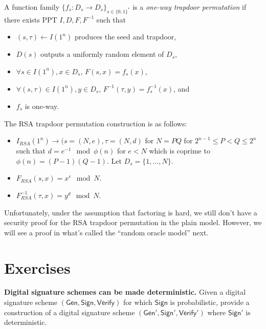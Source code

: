 \begin{definition} 
A function family $\{f_s: D_s \to D_s\}_{s \in \{0,1\}^*}$ is a \emph{one-way trapdoor permutation} if there exists PPT $I, D, F, F^{-1}$ such that 
\begin{itemize}
    \item $(s, \tau) \leftarrow I(1^n)$ produces the seed and trapdoor, 
    
    \item $D(s)$ outputs a uniformly random element of $D_s$, 

    \item $\forall s \in I(1^n), x \in D_s$, $F(s, x) = f_s(x)$, 

    \item $\forall (s, \tau) \in I(1^n), y \in D_s$, $F^{-1}(\tau, y) = f_s^{-1}(x)$, and 

    \item $f_s$ is one-way. 
\end{itemize}
\end{definition} 

The RSA trapdoor permutation construction is as follows: 
\begin{itemize} 
    
    \item $I_{RSA}(1^n) \rightarrow (s = (N, e), \tau = (N, d)$ for $N = PQ$ for $2^{n-1} \leq P < Q \leq 2^n$ such that $d = e^{-1} \mod \phi(n)$ for $e < N$ which is coprime to $\phi(n) = (P-1)(Q-1)$. 
    Let $D_s = \{1, \ldots, N\}$. 

    \item $F_{RSA}(s, x) = x^e \mod N$. 

    \item $F_{RSA}^{-1}(\tau, x) = y^d \mod N$. 
\end{itemize}
Unfortunately, under the assumption that factoring is hard, we still don't have a security proof for the RSA trapdoor permutation in the plain model. 
However, we will see a proof in what's called the ``random oracle model'' next. 



\section*{Exercises}
\begin{exercise}
\textbf{Digital signature schemes can be made deterministic.} Given a digital signature scheme $(\mathsf{Gen}, \mathsf{Sign}, \mathsf{Verify})$ for which $\mathsf{Sign}$ is probabilistic, provide a construction of a digital signature scheme $(\mathsf{Gen}', \mathsf{Sign}', \mathsf{Verify}')$ where $\mathsf{Sign}'$ is deterministic.
\end{exercise}
